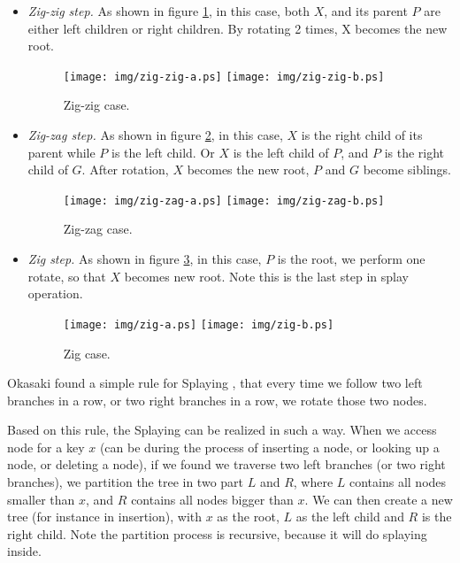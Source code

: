 \documentclass{article}
\begin{document}
\begin{itemize}
\item {\em Zig-zig step.} As shown in figure \ref{fig:zig-zig}, in this case,
both $X$, and its parent $P$ are either left children or right children. By
rotating 2 times, X becomes the new root.

\begin{figure}[htbp]
   \begin{center}
   	  \texttt{[image: img/zig-zig-a.ps]}
          \texttt{[image: img/zig-zig-b.ps]}
          \caption{Zig-zig case.} \label{fig:zig-zig}
   \end{center}
\end{figure}

\item {\em Zig-zag step.} As shown in figure \ref{fig:zig-zag}, in this
case, $X$ is the right child of its parent while $P$ is the left child.
Or $X$ is the left child of $P$, and $P$ is the right child of $G$.
After rotation, $X$ becomes the new root, $P$ and $G$ become siblings.

\begin{figure}[htbp]
   \begin{center}
   	  \texttt{[image: img/zig-zag-a.ps]}
          \texttt{[image: img/zig-zag-b.ps]}
          \caption{Zig-zag case.} \label{fig:zig-zag}
   \end{center}
\end{figure}

\item {\em Zig step.} As shown in figure \ref{fig:zig}, in this case,
$P$ is the root, we perform one rotate, so that $X$ becomes new root.
Note this is the last step in splay operation.

\begin{figure}[htbp]
   \begin{center}
   	  \texttt{[image: img/zig-a.ps]}
          \texttt{[image: img/zig-b.ps]}
          \caption{Zig case.} \label{fig:zig}
   \end{center}
\end{figure}

\end{itemize}

Okasaki found a simple rule for Splaying \cite{okasaki-book},
that every time we follow
two left branches in a row, or two right branches in a row, we rotate
those two nodes.

Based on this rule, the Splaying can be realized in such a way.
When we access node for a key $x$ (can be during the process of
inserting a node, or looking up a node, or deleting a node), if
we found we traverse two left branches (or two right branches), we
partition the tree in two part $L$ and $R$, where $L$ contains all
nodes smaller than $x$, and $R$ contains all nodes bigger than $x$.
We can then create a new tree (for instance in insertion),
with $x$ as the root, $L$ as the left child and $R$ is the right child.
Note the partition process is recursive, because it will do splaying
inside.
\end{document}
